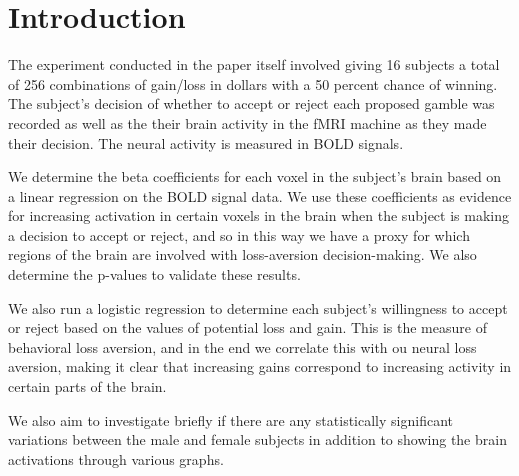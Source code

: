 \section{Introduction}
The experiment conducted in the paper itself involved giving 16 subjects a total of 256 combinations of gain/loss in dollars with a 50 percent chance of winning. The subject's decision of whether to accept or reject each proposed gamble was recorded as well as the their brain activity in the fMRI machine as they made their decision. The neural activity is measured in BOLD signals.

\par 
We determine the beta coefficients for each voxel in the subject's brain based on a linear regression on the BOLD signal data. We use these coefficients as evidence for increasing activation in certain voxels in the brain when the subject is making a decision to accept or reject, and so in this way we have a proxy for which regions of the brain are involved with loss-aversion decision-making. We also determine the p-values to validate these results.

\par 
We also run a logistic regression to determine each subject's willingness to accept or reject based on the values of potential loss and gain. This is the measure of behavioral loss aversion, and in the end we correlate this with ou neural loss aversion, making it clear that increasing gains correspond to increasing activity in certain parts of the brain.  

\par 
We also aim to investigate briefly if there are any statistically significant variations between the male and female subjects in addition to showing the brain activations through various graphs.

